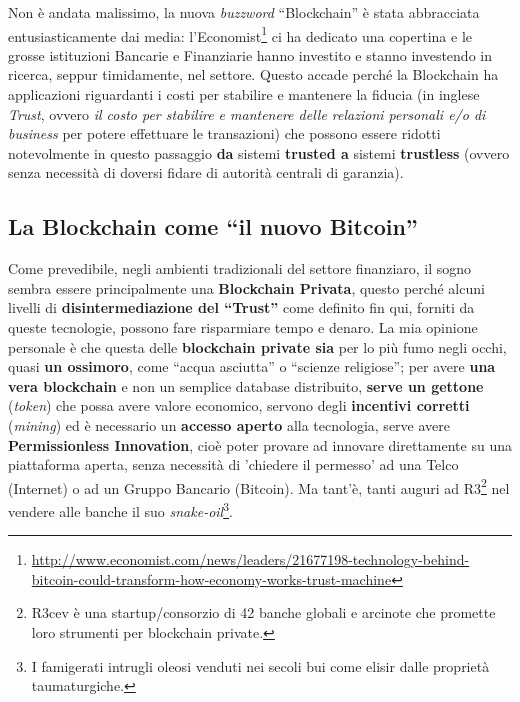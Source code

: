 \documentclass[a4paper,12pt,italian]{article}
\begin{document}
\bigskip

Non è andata malissimo, la nuova \emph{buzzword} “Blockchain” è stata abbracciata
entusiasticamente dai media: l’Economist\footnote{\url{http://www.economist.com/news/leaders/21677198-technology-behind-bitcoin-could-transform-how-economy-works-trust-machine}}
ci ha dedicato una copertina e le grosse istituzioni Bancarie e Finanziarie
hanno investito e stanno investendo in ricerca, seppur timidamente, nel settore.
Questo accade perché la Blockchain ha applicazioni
riguardanti i costi per stabilire e mantenere la fiducia (in inglese \emph{Trust}, ovvero \emph{il costo per stabilire
e mantenere delle relazioni personali e/o di business} per potere effettuare le transazioni) che possono essere ridotti
notevolmente in questo passaggio \textbf{da} sistemi​ \textbf{trusted a} sistemi \textbf{trustless} (ovvero senza necessità di doversi fidare di 
autorità centrali di garanzia).

\subsection*{La Blockchain come “il nuovo Bitcoin”}


Come prevedibile, negli ambienti tradizionali del settore finanziaro, il sogno sembra essere principalmente una
\textbf{Blockchain Privata}, questo perché alcuni livelli di \textbf{disintermediazione del
“Trust”} come definito fin qui, forniti da queste tecnologie, possono fare risparmiare tempo e denaro. La mia
opinione personale è che questa delle \textbf{blockchain private sia} per lo più fumo negli occhi,
quasi \textbf{un ossimoro}, come “acqua asciutta” o “scienze religiose”; per avere
\textbf{una vera blockchain} e non un semplice database distribuito, \textbf{serve un
gettone} (\emph{token}) che possa avere valore economico, servono degli \textbf{incentivi corretti}
(\emph{mining}) ed è necessario un \textbf{accesso aperto} alla tecnologia, serve avere
\textbf{Permissionless Innovation}, cioè poter provare ad innovare direttamente su una piattaforma aperta,
senza necessità di 'chiedere il permesso'
ad una Telco (Internet) o ad un Gruppo Bancario (Bitcoin). Ma tant’è, tanti auguri ad R3\footnote{R3cev è una
startup/consorzio di 42 banche globali e arcinote che promette loro strumenti per blockchain private.} nel
vendere alle banche il suo \emph{snake-oil}\footnote{I famigerati intrugli oleosi venduti nei secoli bui
come elisir dalle proprietà taumaturgiche.}.
 
 
\bigskip
 
\end{document}
